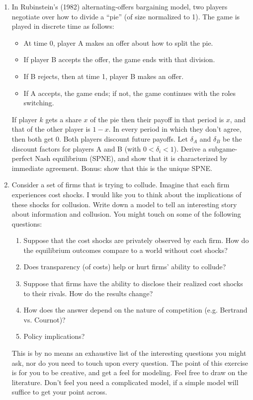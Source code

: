 \documentclass[12pt]{article}
\begin{document}
\begin{enumerate}
\item In Rubinstein’s (1982) alternating-offers bargaining model, two players negotiate over how to divide a “pie” (of size normalized to 1). The game is played in discrete time as follows:
    \begin{itemize}
        \item At time 0, player A makes an offer about how to split the pie.
        \item If player B accepts the offer, the game ends with that division.
        \item If B rejects, then at time 1, player B makes an offer.
        \item If A accepts, the game ends; if not, the game continues with the roles switching.
    \end{itemize}
    If player $k$ gets a share $x$ of the pie then their payoff in that period is $x$, and that of the other player is $1-x$. In every period in which they don’t agree, then both get 0. Both players discount future payoffs. Let $\delta_A$ and $\delta_B$ be the discount factors for players A and B (with $0 < \delta_i < 1$). Derive a subgame-perfect Nash equilibrium (SPNE), and show that it is characterized by immediate agreement. Bonus: show that this is the unique SPNE.

\item Consider a set of firms that is trying to collude. Imagine that each firm experiences cost shocks. I would like you to think about the implications of these shocks for collusion. Write down a model to tell an interesting story about information and collusion. You might touch on some of the following questions:
    \begin{enumerate}
        \item Suppose that the cost shocks are privately observed by each firm. How do the equilibrium outcomes compare to a world without cost shocks?
        \item Does transparency (of costs) help or hurt firms’ ability to collude?
        \item Suppose that firms have the ability to disclose their realized cost shocks to their rivals. How do the results change?
        \item How does the answer depend on the nature of competition (e.g. Bertrand vs. Cournot)?
        \item Policy implications?
    \end{enumerate}
    This is by no means an exhaustive list of the interesting questions you might ask, nor do you need to touch upon every question. The point of this exercise is for you to be creative, and get a feel for modeling. Feel free to draw on the literature. Don’t feel you need a complicated model, if a simple model will suffice to get your point across.

\end{enumerate}
\end{document}
